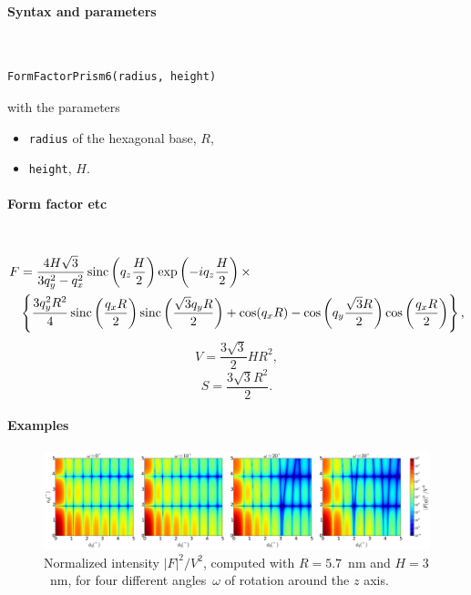 \FloatBarrier

\paragraph{Syntax and parameters}\strut\\[-2ex plus .2ex minus .2ex]
\begin{lstlisting}[language=python, style=eclipseboxed,numbers=none,nolol]
  FormFactorPrism6(radius, height)
\end{lstlisting}
with the parameters
\begin{itemize}
\item \texttt{radius} of the hexagonal base, $R$,
\item \texttt{height}, $H$.
\end{itemize}


\paragraph{Form factor etc}\strut\\
\begin{align*}
F &= \frac{4H\sqrt{3}}{3q_y^2 - q_x^2}
\operatorname{sinc}\left(q_z\frac{H}{2}\right) \exp\left(-i q_z\frac{ H}{2}\right)\times\\
&\left\{\frac{3q_y^2R^2}{4} \operatorname{sinc}\left(\frac{q_x
  R}{2}\right)\operatorname{sinc}\left(\frac{\sqrt{3}q_yR }{2}\right)+ \cos(q_x R)-\cos\left(q_y
\frac{\sqrt{3}R}{2}\right) \cos\left(\frac{q_x R}{2}\right)\right\},
\end{align*}
\begin{equation*}
  V = \dfrac{3\sqrt{3}}{2}H R^2,
\end{equation*}
\begin{equation*}
  S =\dfrac{3\sqrt{3}R^2}{2}.
\end{equation*}

\paragraph{Examples}\strut

\begin{figure}[H]
\begin{center}
\includegraphics[width=\textwidth]{fig/ff2/ff_prism6.pdf}
\end{center}
\caption{Normalized intensity $|F|^2/V^2$,
computed with $R=5.7$~nm and $H=3$~nm,
for four different angles~$\omega$ of rotation around the $z$ axis.}
\label{fig:FFprism6Ex}
\end{figure}

